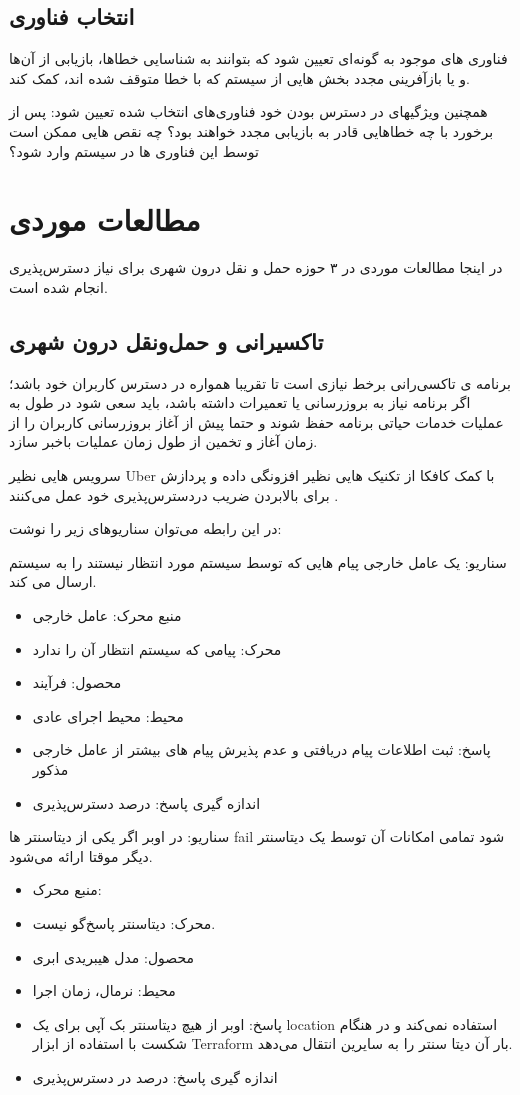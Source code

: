 \subsection{انتخاب فناوری}
فناوری های موجود به گونه‌ای تعیین شود که بتوانند به شناسایی خطا‌ها، بازیابی از آن‌ها و یا بازآفرینی مجدد بخش هایی از سیستم که با خطا متوقف شده اند، کمک کند.

همچنین ویژگیهای در دسترس بودن خود فناوری‌های انتخاب شده تعیین شود: پس از برخورد با چه خطا‌هایی قادر به بازیابی مجدد خواهند بود؟ چه نقص هایی ممکن است توسط این فناوری ها در سیستم وارد شود؟


\section{مطالعات موردی}

در اینجا مطالعات موردی در ۳ حوزه حمل و نقل درون شهری برای نیاز دسترس‌پذیری انجام شده است. 
\subsection{تاکسیرانی و حمل‌و‌نقل درون شهری}
برنامه ی تاکسی‌رانی برخط نیازی است تا تقریبا همواره در دسترس کاربران خود باشد؛ اگر برنامه نیاز به بروز‌رسانی یا تعمیرات داشته باشد، باید سعی شود در طول به عملیات خدمات حیاتی برنامه حفظ شوند و حتما پیش از آغاز بروزرسانی کاربران را از زمان آغاز و تخمین از طول زمان عملیات باخبر سازد.

سرویس هایی نظیر Uber با کمک کافکا از تکنیک هایی نظیر افزونگی داده و پردازش برای بالابردن ضریب دردسترس‌پذیری خود عمل می‌کنند \cite{uber_kafka}.

در این رابطه می‌توان سناریو‌های زیر را نوشت:

سناریو: یک عامل خارجی پیام هایی که توسط سیستم مورد انتظار نیستند را به سیستم ارسال می کند.
\begin{itemize}
\item
منبع محرک: عامل خارجی
\item
محرک: پیامی که سیستم انتظار آن را ندارد
\item
محصول: فرآیند
\item
محیط: محیط اجرای عادی
\item
پاسخ: ثبت اطلاعات پیام دریافتی و عدم پذیرش پیام های بیشتر از عامل خارجی مذکور
\item
اندازه گیری پاسخ: درصد دسترس‌پذیری
\end{itemize}


سناریو: در اوبر اگر یکی از دیتاسنتر ها fail شود تمامی امکانات آن توسط یک دیتاسنتر دیگر موقتا ارائه می‌شود.
\begin{itemize}
\item
منبع محرک: 
\item
محرک: دیتاسنتر پاسخ‌گو نیست.
\item
محصول: مدل‌ هیبریدی ابری 
\item
محیط: نرمال، زمان اجرا
\item
پاسخ: اوبر از هیچ دیتاسنتر بک آپی برای یک location استفاده نمی‌کند و در هنگام شکست با استفاده از ابزار Terraform بار آن دیتا سنتر را به سایرین انتقال می‌دهد.
\item
اندازه گیری پاسخ: درصد در دسترس‌پذیری
\end{itemize}



